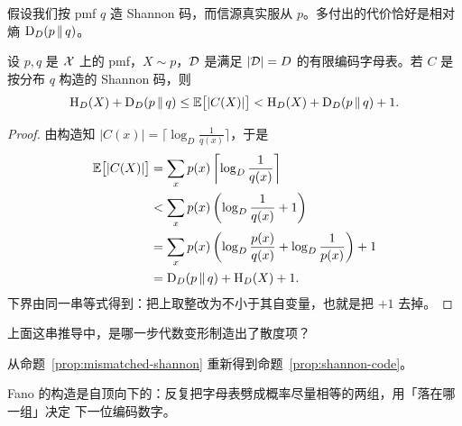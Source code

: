 
假设我们按 pmf $q$ 造 Shannon 码，而信源真实服从 $p$。多付出的代价恰好是相对熵
$\mathrm{D}_D(p\,\|\,q)$。

\begin{proposition}\label{prop:mismatched-shannon}
设 $p,q$ 是 $\mathcal{X}$ 上的 pmf，$X\sim p$，$\mathcal{D}$ 是满足 $|\mathcal{D}|=D$ 的有限编码字母表。若 $C$
是按分布 $q$ 构造的 Shannon 码，则
\[
  \mathrm{H}_D(X)+\mathrm{D}_D(p\,\|\,q)
  \le\mathbb{E}\bigl[|C(X)|\bigr]
  <\mathrm{H}_D(X)+\mathrm{D}_D(p\,\|\,q)+1 .
\]
\end{proposition}

\begin{proof}
由构造知 $|C(x)|=\lceil\log_D\frac1{q(x)}\rceil$，于是
\[
\begin{aligned}
  \mathbb{E}\bigl[|C(X)|\bigr]
  &=\sum_xp(x)\left\lceil\log_D\frac1{q(x)}\right\rceil\\
  &<\sum_xp(x)\left(\log_D\frac1{q(x)}+1\right)\\
  &=\sum_xp(x)\left(\log_D\frac{p(x)}{q(x)}
    +\log_D\frac1{p(x)}\right)+1\\
  &=\mathrm{D}_D(p\,\|\,q)+\mathrm{H}_D(X)+1 .
\end{aligned}
\]
下界由同一串等式得到：把上取整改为不小于其自变量，也就是把 $+1$ 去掉。
\end{proof}

\begin{yourturn}
上面这串推导中，是哪一步代数变形制造出了散度项？
\ifshowanswers\else\workspace[2]\fi
{}
\end{yourturn}

\begin{yourturn}
从命题~\ref{prop:mismatched-shannon} 重新得到命题~\ref{prop:shannon-code}。
\ifshowanswers\else\workspace[1]\fi
{}
\end{yourturn}


Fano 的构造是自顶向下的：反复把字母表劈成概率尽量相等的两组，用「落在哪一组」决定
下一位编码数字。

